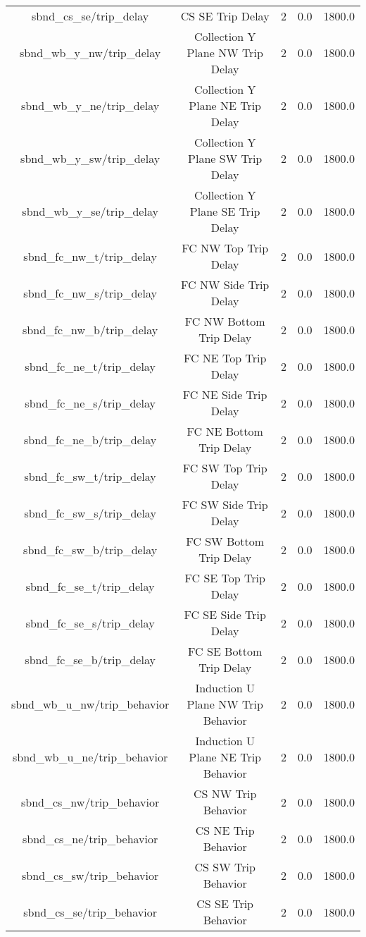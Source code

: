 \begin{center}
\begin{longtable}{c | c c c c }
sbnd\_cs\_se/trip\_delay & CS SE Trip Delay & 2 & 0.0 & 1800.0\\ 
sbnd\_wb\_y\_nw/trip\_delay & Collection Y Plane NW Trip Delay & 2 & 0.0 & 1800.0\\ 
sbnd\_wb\_y\_ne/trip\_delay & Collection Y Plane NE Trip Delay & 2 & 0.0 & 1800.0\\ 
sbnd\_wb\_y\_sw/trip\_delay & Collection Y Plane SW Trip Delay & 2 & 0.0 & 1800.0\\ 
sbnd\_wb\_y\_se/trip\_delay & Collection Y Plane SE Trip Delay & 2 & 0.0 & 1800.0\\ 
sbnd\_fc\_nw\_t/trip\_delay & FC NW Top Trip Delay & 2 & 0.0 & 1800.0\\ 
sbnd\_fc\_nw\_s/trip\_delay & FC NW Side Trip Delay & 2 & 0.0 & 1800.0\\ 
sbnd\_fc\_nw\_b/trip\_delay & FC NW Bottom Trip Delay & 2 & 0.0 & 1800.0\\ 
sbnd\_fc\_ne\_t/trip\_delay & FC NE Top Trip Delay & 2 & 0.0 & 1800.0\\ 
sbnd\_fc\_ne\_s/trip\_delay & FC NE Side Trip Delay & 2 & 0.0 & 1800.0\\ 
sbnd\_fc\_ne\_b/trip\_delay & FC NE Bottom Trip Delay & 2 & 0.0 & 1800.0\\ 
sbnd\_fc\_sw\_t/trip\_delay & FC SW Top Trip Delay & 2 & 0.0 & 1800.0\\ 
sbnd\_fc\_sw\_s/trip\_delay & FC SW Side Trip Delay & 2 & 0.0 & 1800.0\\ 
sbnd\_fc\_sw\_b/trip\_delay & FC SW Bottom Trip Delay & 2 & 0.0 & 1800.0\\ 
sbnd\_fc\_se\_t/trip\_delay & FC SE Top Trip Delay & 2 & 0.0 & 1800.0\\ 
sbnd\_fc\_se\_s/trip\_delay & FC SE Side Trip Delay & 2 & 0.0 & 1800.0\\ 
sbnd\_fc\_se\_b/trip\_delay & FC SE Bottom Trip Delay & 2 & 0.0 & 1800.0\\ 
sbnd\_wb\_u\_nw/trip\_behavior & Induction U Plane NW Trip Behavior & 2 & 0.0 & 1800.0\\ 
sbnd\_wb\_u\_ne/trip\_behavior & Induction U Plane NE Trip Behavior & 2 & 0.0 & 1800.0\\ 
sbnd\_cs\_nw/trip\_behavior & CS NW Trip Behavior & 2 & 0.0 & 1800.0\\ 
sbnd\_cs\_ne/trip\_behavior & CS NE Trip Behavior & 2 & 0.0 & 1800.0\\ 
sbnd\_cs\_sw/trip\_behavior & CS SW Trip Behavior & 2 & 0.0 & 1800.0\\ 
sbnd\_cs\_se/trip\_behavior & CS SE Trip Behavior & 2 & 0.0 & 1800.0\\ 

\end{longtable}
\end{center}
